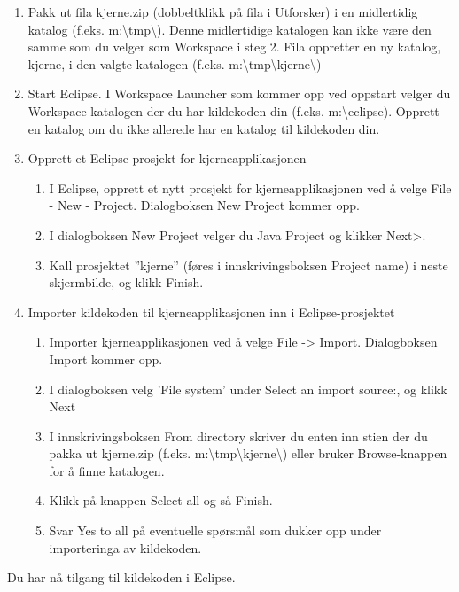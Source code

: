 \documentclass[a4paper]{scrartcl}
\begin{document}
\begin{enumerate}

\item
Pakk ut fila kjerne.zip (dobbeltklikk på fila i Utforsker) i en midlertidig katalog (f.eks. m:\textbackslash tmp\textbackslash ).  Denne midlertidige katalogen kan ikke være den samme som du velger som Workspace i steg 2. Fila oppretter en ny katalog, kjerne, i den valgte katalogen (f.eks. m:\textbackslash tmp\textbackslash kjerne\textbackslash )

\item
Start Eclipse. I Workspace Launcher som kommer opp ved oppstart velger du Workspace-katalogen der du har kildekoden din (f.eks. m:\textbackslash eclipse).  Opprett en katalog om du ikke allerede har en katalog til kildekoden din.

\item
Opprett et Eclipse-prosjekt for kjerneapplikasjonen
\begin{enumerate}

\item
I Eclipse, opprett et nytt prosjekt for kjerneapplikasjonen ved å velge File - New - Project.  Dialogboksen New Project kommer opp.

\item
I dialogboksen New Project velger du Java Project og klikker Next>.

\item
Kall prosjektet ”kjerne” (føres i innskrivingsboksen Project name) i neste skjermbilde, og klikk Finish.

\end{enumerate}

\item
Importer kildekoden til kjerneapplikasjonen inn i Eclipse-prosjektet

\begin{enumerate}

\item
Importer kjerneapplikasjonen ved å velge File -> Import.  Dialogboksen Import kommer opp.

\item
I dialogboksen velg 'File system' under Select an import source:, og klikk Next

\item
I innskrivingsboksen From directory skriver du enten inn stien der du pakka ut kjerne.zip (f.eks. m:\textbackslash tmp\textbackslash kjerne\textbackslash ) eller bruker Browse-knappen for å finne katalogen.

\item
Klikk på knappen Select all og så Finish.

\item
Svar Yes to all på eventuelle spørsmål som dukker opp under importeringa av kildekoden.

\end{enumerate}

\end{enumerate}

Du har nå tilgang til kildekoden i Eclipse.
\end{document}
